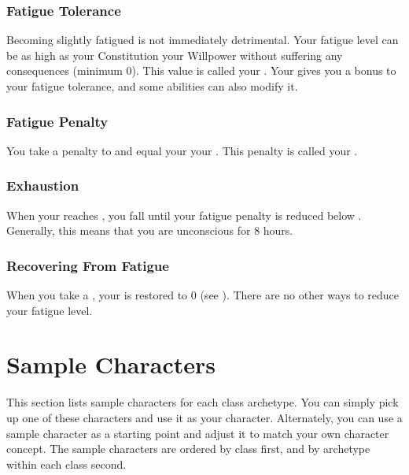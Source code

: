             \subsubsection{Fatigue Tolerance}\label{Fatigue Tolerance}
                Becoming slightly fatigued is not immediately detrimental.
                Your fatigue level can be as high as your Constitution \add your Willpower without suffering any consequences (minimum 0).
                This value is called your .
                Your  gives you a bonus to your fatigue tolerance, and some abilities can also modify it.

            \subsubsection{Fatigue Penalty}\label{Fatigue Penalty}
                You take a penalty to  and  equal your  \sub your .
                This penalty is called your .

        \subsubsection{Exhaustion}\label{Exhaustion}
            When your  reaches , you fall \unconscious until your fatigue penalty is reduced below .
            Generally, this means that you are unconscious for 8 hours.

        \subsubsection{Recovering From Fatigue}
            When you take a , your  is restored to 0 (see ).
            There are no other ways to reduce your fatigue level.

\section{Sample Characters}

    This section lists sample characters for each class archetype.
    You can simply pick up one of these characters and use it as your character.
    Alternately, you can use a sample character as a starting point and adjust it to match your own character concept.
    The sample characters are ordered by class first, and by archetype within each class second.

